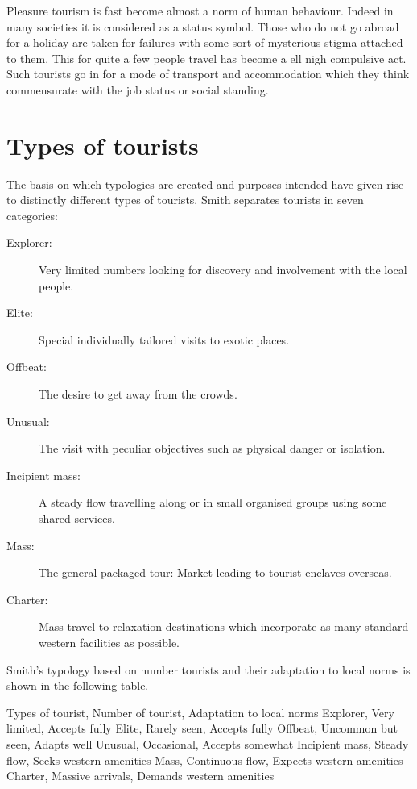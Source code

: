 Pleasure tourism is fast become almost a norm of human behaviour. Indeed in many societies it is considered as a status symbol. Those who do not go abroad for a holiday are taken for failures with some sort of mysterious stigma attached to them. This for quite a few people travel has become a ell nigh compulsive act. Such tourists go in for a mode of transport and accommodation which they think commensurate with the job status or social standing.

\section{Types of tourists} %
\label{sec:tot}

The basis on which typologies are created and purposes intended have given rise to distinctly different types of tourists. Smith separates tourists in seven categories:

\begin{description}
  \item[Explorer:] Very limited numbers looking for discovery and involvement with the local people.
  \item[Elite:] Special individually tailored visits to exotic places.
  \item[Offbeat:] The desire to get away from the crowds.
  \item[Unusual:] The visit with peculiar objectives such as physical danger or isolation.
  \item[Incipient mass:] A steady flow travelling along or in small organised groups using some shared services.
  \item[Mass:] The general packaged tour: Market leading to tourist enclaves overseas.
  \item[Charter:] Mass travel to relaxation destinations which incorporate as many standard western facilities as possible.
\end{description}

Smith's typology based on number tourists and their adaptation to local norms is shown in the following table.

Types of tourist, Number of tourist, Adaptation to local norms
Explorer, Very limited, Accepts fully
Elite, Rarely seen, Accepts fully
Offbeat, Uncommon but seen, Adapts well
Unusual, Occasional, Accepts somewhat
Incipient mass, Steady flow, Seeks western amenities
Mass, Continuous flow, Expects western amenities
Charter, Massive arrivals, Demands western amenities

